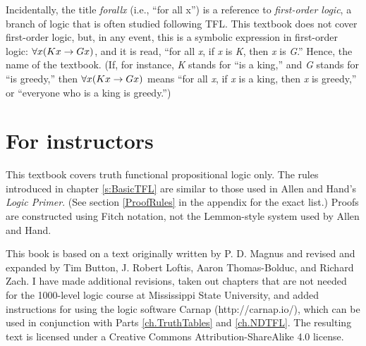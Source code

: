 

Incidentally, the title \textit{forall\hspace{.10em}x} (i.e., ``for all x'') is a reference to \textit{first-order logic}, a branch of logic that is often studied following TFL. This textbook does not cover first-order logic, but, in any event, this is a symbolic expression in first-order logic: $\forall x(Kx \rightarrow Gx)$, and it is read, “for all \textit{x}, if \textit{x} is \textit{K}, then \textit{x} is \textit{G}.” Hence, the name of the textbook. (If, for instance, \textit{K} stands for ``is a king,'' and \textit{G} stands for ``is greedy,'' then $\forall x(Kx \rightarrow Gx)$ means ``for all \textit{x}, if \textit{x} is a king, then \textit{x} is greedy,'' or ``everyone who is a king is greedy.'') 


\section{For instructors}

This textbook covers truth functional propositional logic only. The rules introduced in chapter \ref{s:BasicTFL} are similar to those used in Allen and Hand's \textit{Logic Primer}. (See section \ref{ProofRules} in the appendix for the exact list.) Proofs are constructed using Fitch notation, not the Lemmon-style system used by Allen and Hand.

This book is based on a text originally written by P. D. Magnus and revised and expanded by Tim Button, J. Robert Loftis, Aaron Thomas-Bolduc, and Richard Zach. I have made additional revisions, taken out chapters that are not needed for the 1000-level logic course at Mississippi State University, and added instructions for using the logic software Carnap (http://carnap.io/), which can be used in conjunction with Parts \ref{ch.TruthTables} and \ref{ch.NDTFL}. The resulting text is licensed under a Creative Commons Attribution-ShareAlike 4.0 license.